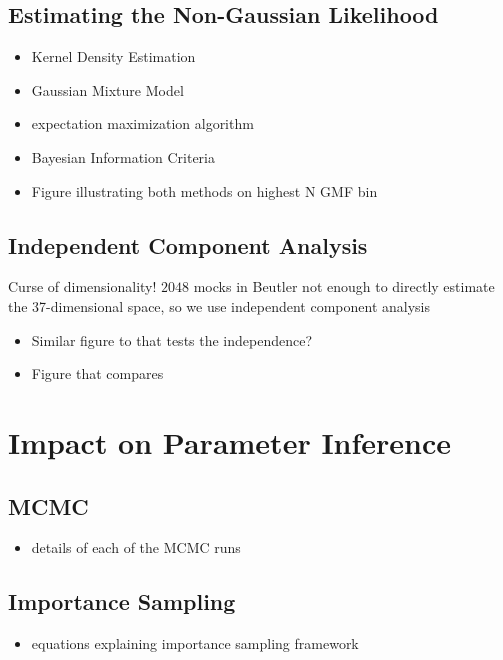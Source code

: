 \documentclass[12pt, letterpaper, preprint]{aastex}
\newcommand{\bitem}{\begin{itemize}}
\newcommand{\eitem}{\end{itemize}}
\begin{document}
\subsection{Estimating the Non-Gaussian Likelihood}
\bitem
    \item Kernel Density Estimation 
    \item Gaussian Mixture Model 
    \item expectation maximization algorithm \cite{dempster1977}
    \item Bayesian Information Criteria 
    \item Figure illustrating both methods on highest N GMF bin 
\eitem

\subsection{Independent Component Analysis} 
Curse of dimensionality! $2048$ mocks in Beutler not enough to directly estimate 
the 37-dimensional space, so we use independent component analysis 
\cite{hartlap2009}
\bitem
    \item Similar figure to \cite{hartlap2009} that tests the independence? 
    \item Figure that compares 
\eitem

\section{Impact on Parameter Inference}
\subsection{MCMC}
\bitem
    \item details of each of the MCMC runs
\eitem

\subsection{Importance Sampling} 
\bitem
    \item equations explaining importance sampling framework
\eitem
\end{document}
